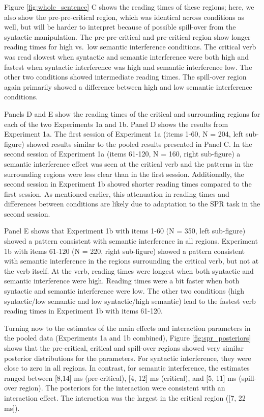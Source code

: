 \documentclass[a4paper, man, floatsintext]{apa7}
\begin{document}
Figure \ref{fig:whole_sentence} C shows the reading times of these regions; here, we also show the pre-pre-critical region, which was identical across conditions as well, but will be harder to interpret because of possible spill-over from the syntactic manipulation. The pre-pre-critical and pre-critical region show longer reading times for high vs.\ low semantic interference conditions. The critical verb was read slowest when syntactic and semantic interference were both high and fastest when syntactic interference was high and semantic interference low. The other two conditions showed intermediate reading times. The spill-over region again primarily showed a difference between high and low semantic interference conditions. 

Panels D and E show the reading times of the critical and surrounding regions for each of the two Experiments 1a and 1b. Panel D shows the results from Experiment 1a. The first session of Experiment 1a (items 1-60, N = 204, left sub-figure) showed results similar to the pooled results presented in Panel C. In the second session of Experiment 1a (items 61-120, N = 160, right sub-figure) a semantic interference effect was seen at the critical verb and the patterns in the surrounding regions were less clear than in the first session. Additionally, the second session in Experiment 1b showed shorter reading times compared to the first session. As mentioned earlier, this attenuation in reading times and differences between conditions are likely due to  adaptation to the SPR task in the second session. 

Panel E shows that Experiment 1b with items 1-60 (N = 350, left sub-figure) showed a pattern consistent with semantic interference in all regions. Experiment 1b with items 61-120 (N = 220, right sub-figure) showed a pattern consistent with semantic interference in the regions surrounding the critical verb, but not at the verb itself. At the verb, reading times were longest when both syntactic and semantic interference were high. Reading times were a bit faster when both syntactic and semantic interference were low. The other two conditions (high syntactic/low semantic and low syntactic/high semantic) lead to the fastest verb reading times in Experiment 1b with items 61-120. 

Turning now to the estimates of the main effects and interaction parameters in the pooled data (Experiments 1a and 1b combined), Figure \ref{fig:spr_posteriors} shows that the pre-critical, critical and spill-over regions showed very similar posterior distributions for the parameters. For syntactic interference, they were close to zero in all regions. In contrast, for semantic interference, the estimates ranged between [8,14] ms (pre-critical), [4, 12] ms (critical), and [5, 11] ms (spill-over region). The posteriors for the interaction were consistent with an interaction effect. The interaction was the  largest in the critical region ([7, 22 ms]). 
\end{document}
